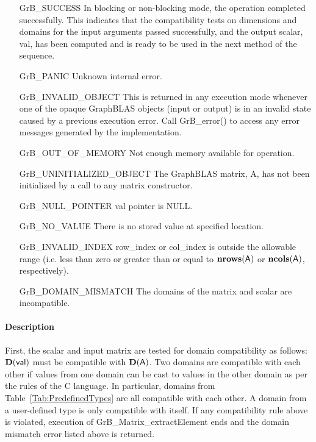 \begin{itemize}[leftmargin=2.1in]
    \item[{\sf GrB\_SUCCESS}]  In blocking or non-blocking mode, the operation 
    completed successfully. This indicates that the compatibility tests on 
    dimensions and domains for the input arguments passed successfully, and
    the output scalar, {\sf val}, has been computed and is ready to be used in 
    the next method of the sequence.

    \item[{\sf GrB\_PANIC}]   Unknown internal error.
    
    \item[{\sf GrB\_INVALID\_OBJECT}] This is returned in any execution mode 
    whenever one of the opaque GraphBLAS objects (input or output) is in an invalid 
    state caused by a previous execution error.  Call {\sf GrB\_error()} to access 
    any error messages generated by the implementation.

    \item[{\sf GrB\_OUT\_OF\_MEMORY}]  Not enough memory available for operation.
    
    \item[{\sf GrB\_UNINITIALIZED\_OBJECT}]  The GraphBLAS matrix, {\sf A}, has 
    not been initialized by a call to any matrix constructor.
    
    \item[{\sf GrB\_NULL\_POINTER}]    {\sf val} pointer is {\sf NULL}.

    \item[{\sf GrB\_NO\_VALUE}]  There is no stored value at specified location.
    
    \item[{\sf GrB\_INVALID\_INDEX}]  {\sf row\_index} or {\sf col\_index} is 
    outside the allowable range (i.e. less than zero or greater than or equal to  $\mathbf{nrows}({\sf A})$ or
    $\mathbf{ncols}({\sf A})$, respectively).

    \item[{\sf GrB\_DOMAIN\_MISMATCH}]     The domains of the matrix and scalar
    are incompatible.
\end{itemize}

\paragraph{Description}

First, the scalar and input matrix are tested for domain compatibility as follows:  
$\mathbf{D}({\sf val})$ must be compatible with $\mathbf{D}({\sf A})$. Two domains 
are compatible with each other if values from one domain can be cast to values 
in the other domain as per the rules of the C language.  In particular, domains 
from Table~\ref{Tab:PredefinedTypes} are all compatible with each other. A domain 
from a user-defined type is only compatible with itself.  If any compatibility 
rule above is violated, execution of {\sf GrB\_Matrix\_extractElement} ends and
the domain mismatch error listed above is returned.

